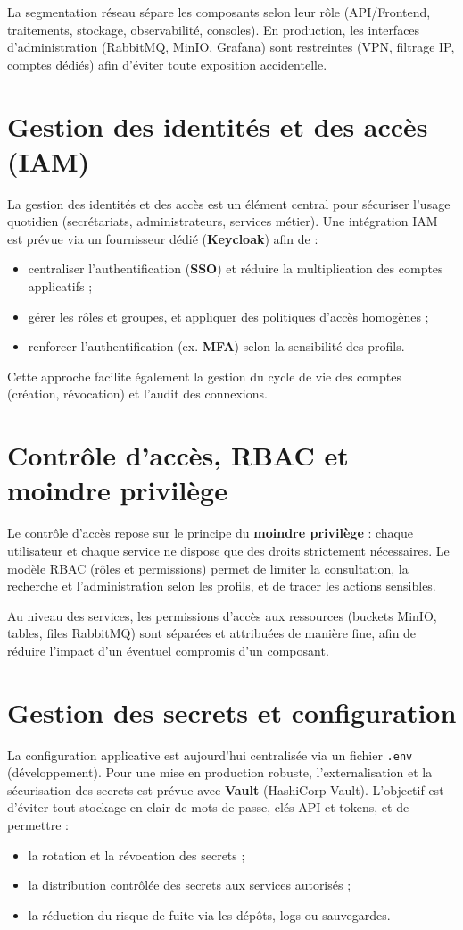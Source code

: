 \documentclass[12pt,a4paper]{report}
\begin{document}
La segmentation réseau sépare les composants selon leur rôle (API/Frontend, traitements, stockage, observabilité, consoles). En production, les interfaces d’administration (RabbitMQ, MinIO, Grafana) sont restreintes (VPN, filtrage IP, comptes dédiés) afin d’éviter toute exposition accidentelle.

\section{Gestion des identités et des accès (IAM)}
La gestion des identités et des accès est un élément central pour sécuriser l’usage quotidien (secrétariats, administrateurs, services métier). Une intégration IAM est prévue via un fournisseur dédié (\textbf{Keycloak}) afin de :
\begin{itemize}
  \item centraliser l’authentification (\textbf{SSO}) et réduire la multiplication des comptes applicatifs ;
  \item gérer les rôles et groupes, et appliquer des politiques d’accès homogènes ;
  \item renforcer l’authentification (ex. \textbf{MFA}) selon la sensibilité des profils.
\end{itemize}
Cette approche facilite également la gestion du cycle de vie des comptes (création, révocation) et l’audit des connexions.

\section{Contrôle d’accès, RBAC et moindre privilège}
Le contrôle d’accès repose sur le principe du \textbf{moindre privilège} : chaque utilisateur et chaque service ne dispose que des droits strictement nécessaires. Le modèle RBAC (rôles et permissions) permet de limiter la consultation, la recherche et l’administration selon les profils, et de tracer les actions sensibles.

Au niveau des services, les permissions d’accès aux ressources (buckets MinIO, tables, files RabbitMQ) sont séparées et attribuées de manière fine, afin de réduire l’impact d’un éventuel compromis d’un composant.

\section{Gestion des secrets et configuration}
La configuration applicative est aujourd’hui centralisée via un fichier \texttt{.env} (développement). Pour une mise en production robuste, l’externalisation et la sécurisation des secrets est prévue avec \textbf{Vault} (HashiCorp Vault). L’objectif est d’éviter tout stockage en clair de mots de passe, clés API et tokens, et de permettre :
\begin{itemize}
  \item la rotation et la révocation des secrets ;
  \item la distribution contrôlée des secrets aux services autorisés ;
  \item la réduction du risque de fuite via les dépôts, logs ou sauvegardes.
\end{itemize}
\end{document}
